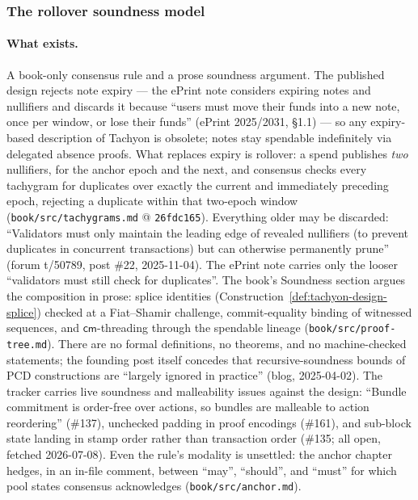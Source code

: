 \documentclass[11pt,a4paper]{article}
\theoremstyle{definition}
\newcommand{\cmsym}{\mathsf{cm}}
\begin{document}
\subsubsection{The rollover soundness model}\label{sec:tachyon-dbu-rollover}

\paragraph{What exists.} A book-only consensus rule and a prose soundness
argument. The published design rejects note expiry --- the ePrint note
considers expiring notes and nullifiers and discards it because ``users must
move their funds into a new note, once per window, or lose their funds''
(ePrint 2025/2031, \S1.1) --- so any expiry-based description of Tachyon is
obsolete; notes stay spendable indefinitely via delegated absence proofs.
What replaces expiry is rollover: a spend publishes \emph{two} nullifiers,
for the anchor epoch and the next, and consensus checks every tachygram for
duplicates over exactly the current and immediately preceding epoch,
rejecting a duplicate within that two-epoch window
(\texttt{book/src/tachygrams.md} @ \texttt{26fdc165}). Everything older may
be discarded: ``Validators must only maintain the leading edge of revealed
nullifiers (to prevent duplicates in concurrent transactions) but can
otherwise permanently prune'' (forum t/50789, post \#22, 2025-11-04). The
ePrint note carries only the looser ``validators must still check for
duplicates''. The book's Soundness section argues the composition in prose:
splice identities (Construction~\ref{def:tachyon-design-splice})
checked at a Fiat--Shamir challenge, commit-equality binding of witnessed
sequences, and $\cmsym$-threading through the spendable lineage
(\texttt{book/src/proof-tree.md}). There are no formal definitions, no
theorems, and no machine-checked statements; the founding post itself
concedes that recursive-soundness bounds of PCD constructions are ``largely
ignored in practice'' (blog, 2025-04-02). The tracker carries live soundness
and malleability issues against the design: ``Bundle commitment is
order-free over actions, so bundles are malleable to action reordering''
(\#137), unchecked padding in proof encodings (\#161), and sub-block state
landing in stamp order rather than transaction order (\#135; all open,
fetched 2026-07-08). Even the rule's modality is unsettled: the
anchor chapter hedges, in an in-file comment, between ``may'', ``should'',
and ``must'' for which pool states consensus acknowledges
(\texttt{book/src/anchor.md}).
\end{document}
